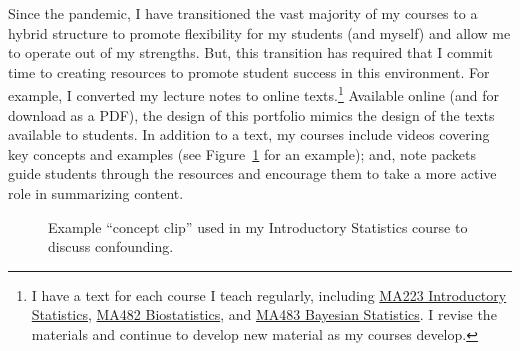 \documentclass[
  letterpaper,
  DIV=11,
  numbers=noendperiod]{scrreprt}
\begin{document}
Since the pandemic, I have transitioned the vast majority of my courses
to a hybrid structure to promote flexibility for my students (and
myself) and allow me to operate out of my strengths. But, this
transition has required that I commit time to creating resources to
promote student success in this environment. For example, I converted my
lecture notes to online texts.\footnote{I have a text for each course I
  teach regularly, including
  \href{https://reyesem.github.io/introstat-text/}{MA223 Introductory
  Statistics}, \href{https://reyesem.github.io/biostat-text/}{MA482
  Biostatistics}, and \href{https://reyesem.github.io/bayes-text/}{MA483
  Bayesian Statistics}. I revise the materials and continue to develop
  new material as my courses develop.} Available online (and for
download as a PDF), the design of this portfolio mimics the design of
the texts available to students. In addition to a text, my courses
include videos covering key concepts and examples (see
Figure~\ref{fig-confounding-video} for an example); and, note packets
guide students through the resources and encourage them to take a more
active role in summarizing content.

\begin{figure}


\caption{\label{fig-confounding-video}Example ``concept clip'' used in
my Introductory Statistics course to discuss confounding.}

\end{figure}%
\end{document}
